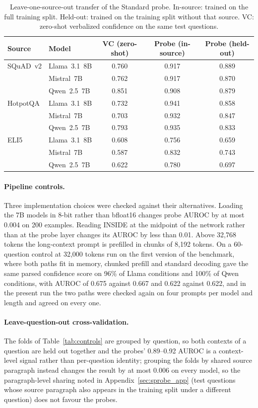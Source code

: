 \documentclass[acmsmall,screen,review]{acmart}
\begin{document}
\begin{table}[h]
\centering
\caption{Leave-one-source-out transfer of the Standard probe. In-source: trained on the full training split. Held-out: trained on the training split without that source. VC: zero-shot verbalized confidence on the same test questions.}
\label{tab:loso}
\small
\begin{tabular}{llccc}
\toprule
Source & Model & VC (zero-shot) & Probe (in-source) & Probe (held-out) \\
\midrule
SQuAD~v2  & Llama~3.1~8B  & 0.760 & 0.917 & 0.889 \\
          & Mistral~7B    & 0.762 & 0.917 & 0.870 \\
          & Qwen~2.5~7B   & 0.851 & 0.908 & 0.879 \\
HotpotQA  & Llama~3.1~8B  & 0.732 & 0.941 & 0.858 \\
          & Mistral~7B    & 0.703 & 0.932 & 0.847 \\
          & Qwen~2.5~7B   & 0.793 & 0.935 & 0.833 \\
ELI5      & Llama~3.1~8B  & 0.608 & 0.756 & 0.659 \\
          & Mistral~7B    & 0.587 & 0.832 & 0.743 \\
          & Qwen~2.5~7B   & 0.622 & 0.780 & 0.697 \\
\bottomrule
\end{tabular}
\end{table}

\paragraph{Pipeline controls.}
Three implementation choices were checked against their alternatives. Loading the 7B models in 8-bit rather than bfloat16 changes probe AUROC by at most 0.004 on 200 examples. Reading INSIDE at the midpoint of the network rather than at the probe layer changes its AUROC by less than 0.01. Above 32,768 tokens the long-context prompt is prefilled in chunks of 8,192 tokens. On a 60-question control at 32,000 tokens run on the first version of the benchmark, where both paths fit in memory, chunked prefill and standard decoding gave the same parsed confidence score on 96\% of Llama conditions and 100\% of Qwen conditions, with AUROC of 0.675 against 0.667 and 0.622 against 0.622, and in the present run the two paths were checked again on four prompts per model and length and agreed on every one.

\paragraph{Leave-question-out cross-validation.}
The folds of Table~\ref{tab:controls} are grouped by question, so both contexts of a question are held out together and the probes' 0.89--0.92 AUROC is a context-level signal rather than per-question identity; grouping the folds by shared source paragraph instead changes the result by at most 0.006 on every model, so the paragraph-level sharing noted in Appendix~\ref{sec:sprobe_app} (test questions whose source paragraph also appears in the training split under a different question) does not favour the probes.
\end{document}

